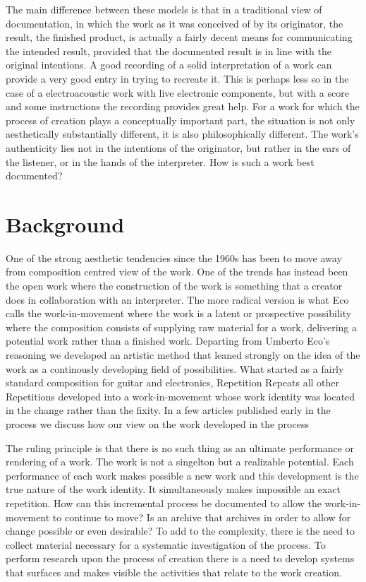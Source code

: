 \documentclass[12pt]{article}
\begin{document}
The main difference between these models is that in a traditional view of documentation, in which the work as it was conceived of by its originator, the result, the finished product, is actually a fairly decent means for communicating the intended result, provided that the documented result is in line with the original intentions. A good recording of a solid interpretation of a work can provide a very good entry in trying to recreate it. This is perhaps less so in the case of a electroacoustic work with live electronic components, but with a score and some instructions the recording provides great help. For a work for which the process of creation plays a conceptually important part, the situation is not only aesthetically substantially different, it is also philosophically different. The work's authenticity lies not in the intentions of the originator, but rather in the ears of the listener, or in the hands of the interpreter. How is such a work best documented?

\section{Background}
\label{sec:background}

One of the strong aesthetic tendencies since the 1960s has been to move away from composition centred view of the work. One of the trends has instead been the open work where the construction of the work is something that a creator does in collaboration with an interpreter. The more radical version is what Eco calls the work-in-movement where the work is a latent or prospective possibility where the composition consists of supplying raw material for a work, delivering a potential work rather than a finished work. Departing from Umberto Eco's reasoning we developed an artistic method that leaned strongly on the idea of the work as a continously developing field of possibilities. What started as a fairly standard composition for guitar and electronics, Repetition Repeats all other Repetitions developed into a work-in-movement whose work identity was located in the change rather than the fixity. In a few articles published early in the process we discuss how our view on the work developed in the process  

The ruling principle is that there is no such thing as an ultimate performance or rendering of a work. The work is not a singelton but a realizable potential. Each performance of each work makes possible a new work and this development is the true nature of the work identity. It simultaneously makes impossible an exact repetition. How can this incremental process be documented to allow the work-in-movement to continue to move? Is an archive that archives in order to allow for change possible or even desirable? To add to the complexity, there is the need to collect material necessary for a systematic investigation of the process. To perform research upon the process of creation there is a need to develop systems that surfaces and makes visible the activities that relate to the work creation.
\end{document}
